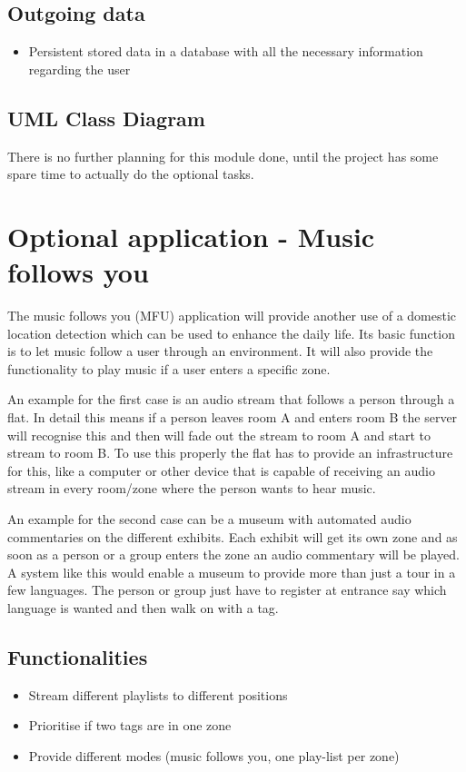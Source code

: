    \subsection{Outgoing data}
    \begin{itemize}
     \item Persistent stored data in a database with all the necessary information regarding the user
    \end{itemize}

   \subsection{UML Class Diagram}
    There is no further planning for this module done, until the project has some spare time to actually do the optional tasks.

  \section{Optional application - Music follows you}
   \label{sec:design:MFU}
   The music follows you (MFU) application will provide another use of a domestic location detection which can be used to enhance the daily life. Its basic function is to let music follow a user through an environment. It will also provide the functionality to play music if a user enters a specific zone.

   An example for the first case is an audio stream that follows a person through a flat. In detail this means if a person leaves room A and enters room B the server will recognise this and then will fade out the stream to room A and start to stream to room B. To use this properly the flat has to provide an infrastructure for this, like a computer or other device that is capable of receiving an audio stream in every room/zone where the person wants to hear music.

   An example for the second case can be a museum with automated audio commentaries on the different exhibits. Each exhibit will get its own zone and as soon as a person or a group enters the zone an audio commentary will be played. A system like this would enable a museum to provide more than just a tour in a few languages. The person or group just have to register at entrance say which language is wanted and then walk on with a tag.

   \subsection{Functionalities}
    \begin{itemize}
     \item Stream different playlists to different positions
     \item Prioritise if two tags are in one zone
     \item Provide different modes (music follows you, one play-list per zone)
    \end{itemize}

